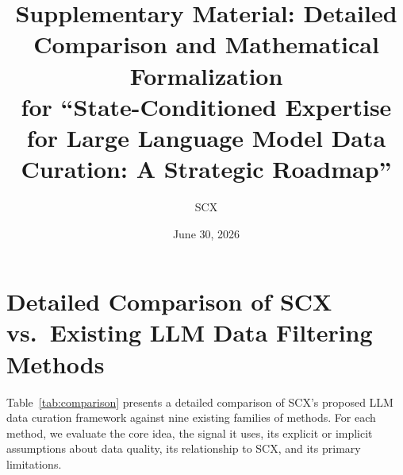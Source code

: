 \documentclass[11pt]{article}
\title{Supplementary Material: Detailed Comparison and Mathematical Formalization\\
       \large for ``State-Conditioned Expertise for Large Language Model Data Curation: A Strategic Roadmap''}
\author{SCX}
\date{June 30, 2026}
\begin{document}
\maketitle

\tableofcontents

\newpage

\section{Detailed Comparison of SCX vs.\ Existing LLM Data Filtering Methods}

Table~\ref{tab:comparison} presents a detailed comparison of SCX's proposed LLM data curation framework against nine existing families of methods. For each method, we evaluate the core idea, the signal it uses, its explicit or implicit assumptions about data quality, its relationship to SCX, and its primary limitations.
\end{document}
